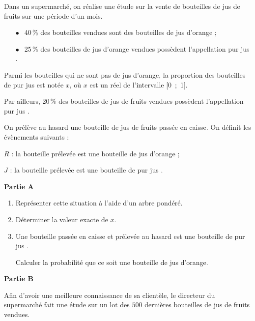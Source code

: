 \documentclass[12pt,french]{article}
\begin{document}
\begin{question}[subtitle={Antilles Guyane septembre 2015}]
Dans un supermarché, on réalise une étude sur la vente de bouteilles de jus de fruits sur une période d'un mois.

\setlength\parindent{8mm}
\begin{itemize}
\item[$\bullet~~$]40\,\% des bouteilles vendues sont des bouteilles de jus d'orange ;
\item[$\bullet~~$]25\,\% des bouteilles de jus d'orange vendues possèdent l'appellation \og pur jus \fg.
\end{itemize}
\setlength\parindent{0mm} 

\medskip

Parmi les bouteilles qui ne sont pas de jus d'orange, la proportion des bouteilles de \og pur jus \fg{} est notée $x$, où $x$ est un réel de l'intervalle [0~;~1].

Par ailleurs, 20\,\% des bouteilles de jus de fruits vendues possèdent l'appellation \og pur jus \fg.

On prélève au hasard une bouteille de jus de fruits passée en caisse. On définit les évènements suivants :

$R$ : la bouteille prélevée est une bouteille de jus d'orange ;

$J$ : la bouteille prélevée est une bouteille de \og pur jus \fg.

\bigskip

\textbf{Partie A}

\medskip

\begin{enumerate}
\item Représenter cette situation à l'aide d'un arbre pondéré.
\item Déterminer la valeur exacte de $x$.
\item Une bouteille passée en caisse et prélevée au hasard est une bouteille de \og pur jus \fg.

Calculer la probabilité que ce soit une bouteille de jus d'orange.
\end{enumerate}

\bigskip

\textbf{Partie B}

\medskip

Afin d'avoir une meilleure connaissance de sa clientèle, le directeur du supermarché fait une étude sur un lot des $500$ dernières bouteilles de jus de fruits vendues.


\end{question}
\end{document}
